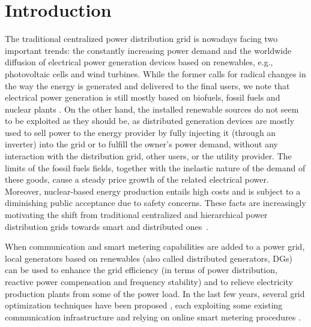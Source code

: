 \documentclass[journal]{IEEEtran}
\begin{document}
\section{Introduction}
The traditional centralized power distribution grid is nowadays facing two important trends: the constantly increasing power demand \cite{EIA-outlook} and the worldwide diffusion of electrical power generation devices based on renewables, e.g., photovoltaic cells and wind turbines. While the former  calls for radical changes in the way the energy is generated and delivered to the final users, we note that electrical power generation is still mostly based on biofuels, fossil fuels and nuclear plants \cite{IEA-stat}. On the other hand, the installed renewable sources do not seem to be exploited as they should be, as distributed generation devices are mostly used to sell power to the energy provider by fully injecting it (through an inverter) into the grid or to fulfill the owner's power demand, without any interaction with the distribution grid, other users, or the utility provider. The limits of the fossil fuels fields, together with the inelastic nature of the demand of these goods, cause a steady price growth of the related electrical power. Moreover, nuclear-based energy production entails high costs and is subject to a diminishing public acceptance due to safety concerns. These facts are increasingly motivating the shift from traditional centralized and hierarchical power distribution grids towards smart and distributed ones~\cite{AKAGI1, BAYOD, SMART-TRENDS}. 

When communication and smart metering capabilities are added to a power grid, local generators based on renewables (also called distributed generators, DGs) can be used to enhance the grid efficiency (in terms of power distribution, reactive power compensation and frequency stability) and to relieve electricity production plants from some of the power load. In the last few years, several grid optimization techniques have been proposed \cite{PE-DISPERSED, LOAD-UNBALANCE, GRID-CONTROL-SYNC, MICRO-STOR-MAN}, each exploiting some existing communication infrastructure and relying on online smart metering procedures \cite{GRID-IMP-EST}. 
\end{document}

